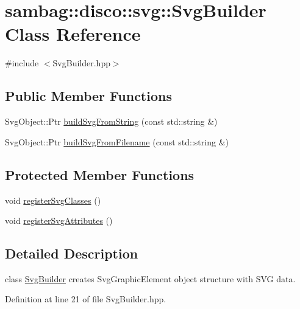 \hypertarget{classsambag_1_1disco_1_1svg_1_1_svg_builder}{
\section{sambag::disco::svg::SvgBuilder Class Reference}
\label{classsambag_1_1disco_1_1svg_1_1_svg_builder}
}


{\ttfamily \#include $<$SvgBuilder.hpp$>$}

\subsection*{Public Member Functions}
\begin{DoxyCompactItemize}
\item 
SvgObject::Ptr \hyperlink{classsambag_1_1disco_1_1svg_1_1_svg_builder_a84dadea0287e483ec0cf62cfaf5d86dd}{buildSvgFromString} (const std::string \&)
\item 
SvgObject::Ptr \hyperlink{classsambag_1_1disco_1_1svg_1_1_svg_builder_a6c4e7ae81b4a3f8b5e5b5be96e3d93b5}{buildSvgFromFilename} (const std::string \&)
\end{DoxyCompactItemize}
\subsection*{Protected Member Functions}
\begin{DoxyCompactItemize}
\item 
void \hyperlink{classsambag_1_1disco_1_1svg_1_1_svg_builder_a2bb5d356ae5d56626670ed0996eed88b}{registerSvgClasses} ()
\item 
void \hyperlink{classsambag_1_1disco_1_1svg_1_1_svg_builder_a9be171dcdb5ab7417a89045f1fb2c8d1}{registerSvgAttributes} ()
\end{DoxyCompactItemize}


\subsection{Detailed Description}
class \hyperlink{classsambag_1_1disco_1_1svg_1_1_svg_builder}{SvgBuilder} creates SvgGraphicElement object structure with SVG data. 

Definition at line 21 of file SvgBuilder.hpp.




